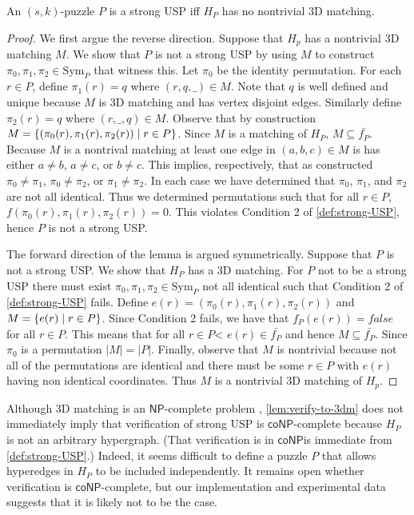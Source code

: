 \documentclass[11pt]{article}
\newcommand\sse{\subseteq}
\newcommand\Sym[1]{\ensuremath{\mathrm{Sym}_{#1}}}
\newcommand\condset[2]{\set{#1 \;|\; #2}}
\renewcommand\NP{\ensuremath{\mathsf{NP}}}
\newcommand\coNP{\ensuremath{\mathsf{coNP}}}
\begin{document}
\begin{lemma}
  \label{lem:verify-to-3dm}
  An $(s,k)$-puzzle $P$ is a strong USP iff $H_P$ has no nontrivial 3D
  matching.
\end{lemma}

\begin{proof}
  We first argue the reverse direction.  Suppose that $H_p$ has a
  nontrivial 3D matching $M$.  We show that $P$ is not a strong USP by
  using $M$ to construct $\pi_0, \pi_1, \pi_2 \in \Sym{P}$ that
  witness this.  Let $\pi_0$ be the identity permutation.  For each $r
  \in P$, define $\pi_1(r) = q$ where $(r,q,\_) \in M$.  Note that $q$
  is well defined and unique because $M$ is 3D matching and has vertex
  disjoint edges.  Similarly define $\pi_2(r) = q$ where $(r,\_,q) \in
  M$.  Observe that by construction $M =
  \condset{(\pi_0(r),\pi_1(r),\pi_2(r))}{r \in P}$.  Since $M$ is a
  matching of $H_P$, $M \sse \bar{f_P}$.  Because $M$ is a nontrival
  matching at least one edge in $(a,b,c) \in M$ is has either $a \neq
  b$, $a \neq c$, or $b \neq c$.  This implies, respectively, that as
  constructed $\pi_0 \neq \pi_1$, $\pi_0 \neq \pi_2$, or $\pi_1 \neq
  \pi_2$.  In each case we have determined that $\pi_0$, $\pi_1$, and
  $\pi_2$ are not all identical.  Thus we determined permutations such
  that for all $r \in P$, $f(\pi_0(r), \pi_1(r), \pi_2(r)) = 0$.  This
  violates Condition 2 of \autoref{def:strong-USP}, hence $P$ is not a
  strong USP.

  The forward direction of the lemma is argued symmetrically.  Suppose
  that $P$ is not a strong USP. We show that $H_P$ has a 3D matching.
  For $P$ not to be a strong USP there must exist $\pi_0, \pi_1, \pi_2
  \in \Sym{P}$ not all identical such that Condition 2 of
  \autoref{def:strong-USP} fails.  Define $e(r) =
  (\pi_0(r),\pi_1(r),\pi_2(r))$ and $M = \condset{e(r)}{r \in P}$.
  Since Condition 2 fails, we have that $f_P(e(r)) = false$ for all $r
  \in P$.  This means that for all $r \in P$< $e(r) \in \bar{f_P}$ and
  hence $M \sse \bar{f_P}$.  Since $\pi_0$ is a permutation $|M| =
  |P|$.  Finally, observe that $M$ is nontrivial because not all of
  the permutations are identical and there must be some $r \in P$ with
  $e(r)$ having non identical coordinates.  Thus $M$ is a nontrivial
  3D matching of $H_p$.
\end{proof}

Although 3D matching is an \NP-complete problem \cite{karp72},
\autoref{lem:verify-to-3dm} does not immediately imply that
verification of strong USP is \coNP-complete because $H_P$ is not an
arbitrary hypergraph.  (That verification is in \coNP is immediate
from \autoref{def:strong-USP}.)  Indeed, it seems difficult to define a
puzzle $P$ that allows hyperedges in $H_P$ to be included
independently.  It remains open whether verification is
\coNP-complete, but our implementation and experimental data suggests
that it is likely not to be the case.
\end{document}
